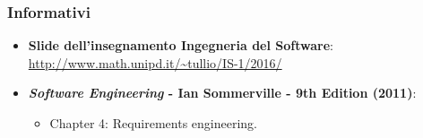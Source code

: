 \subsubsection{Informativi}
\begin{itemize}
	\item \textbf{Slide dell'insegnamento Ingegneria del Software}:
	\url{http://www.math.unipd.it/~tullio/IS-1/2016/}
	\item \textbf{\textit{Software Engineering} - Ian Sommerville - 9th Edition (2011)}:
	\begin{itemize}
		\item Chapter 4: Requirements engineering.
	\end{itemize} 
\end{itemize}